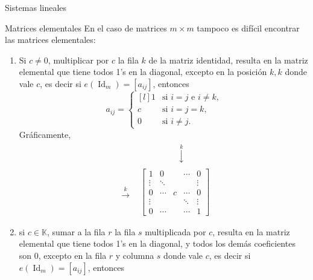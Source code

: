\documentclass[a4paper,12pt,twoside,spanish,reqno]{amsbook}
\numberwithin{equation}{section}
\theoremstyle{definition}
\theoremstyle{remark}
\newcommand{\Id}{\operatorname{Id}}
\newcommand{\K}{\mathbb K}
\begin{document}
\begin{chapter}{Sistemas lineales}
\begin{section}{Matrices elementales}
            En el caso de matrices $m \times m$ tampoco es difícil encontrar las matrices elementales:
            \begin{enumerate}
                \item Si $c \not=0$, multiplicar por  $c$ la fila $k$ de la matriz identidad, resulta en la matriz elemental que tiene todos 1's en la diagonal, excepto en la posición $k,k$ donde vale $c$,  es decir si $e(\Id_m) = [a_{ij}]$,  entonces
                \begin{equation}\label{elem-tipo-1}
                a_{ij} = \left\{ 
                \begin{matrix*}[l]
                1 &\text{si $i=j$ e $i\ne k$,}\\
                c &\text{si $i=j=k$,} \\
                0 \quad&\text{si $i \ne j$.}
                \end{matrix*}\right.
                \end{equation}
                Gráficamente,
                \begin{align*}
                &\begin{matrix}
                {}^{}&{}^{}&{}^{}&{}^{}&{}^{}&\overset{k}{\downarrow}&{}^{}&{}^{}&{}^{}
                \end{matrix} \\
                \begin{matrix}
                {}^{}\\
                {}^{}\\
                \overset{k}{\to}\\
                {}^{}\\
                {}^{}
                \end{matrix}
                &\begin{bmatrix}
                1 & 0 &  &\cdots & 0  \\
                \vdots  & \ddots  & & & \vdots \\
                0 & \cdots &c &\cdots &0 \\
                \vdots  &   & &\ddots & \vdots \\
                0  & \cdots  & &\cdots & 1
                \end{bmatrix}
                \end{align*}
                \item si  $c \in \K$, sumar a la fila $r$  la fila $s$ multiplicada por $c$, resulta en la matriz elemental que tiene todos 1's en la diagonal, y todos los demás coeficientes son 0,  excepto en la fila  $r$ y columna $s$ donde  vale $c$,  es decir si $e(\Id_m) = [a_{ij}]$,  entonces

\end{enumerate}
\end{section}
\end{chapter}
\end{document}
